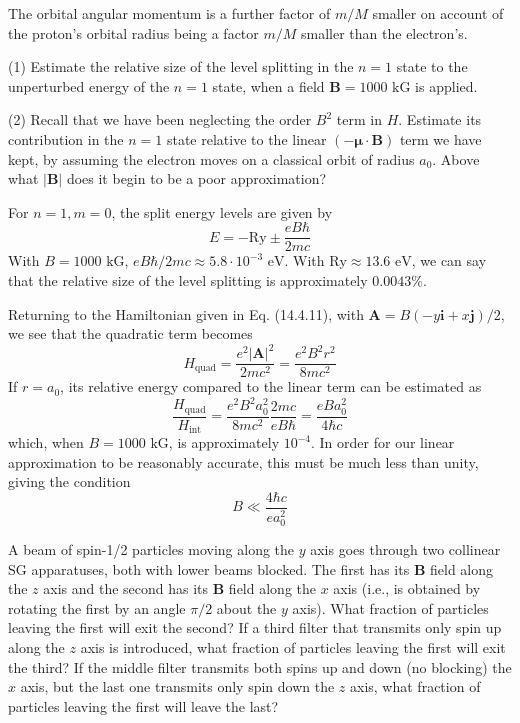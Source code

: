 \documentclass[../principles-of-quantum-mechanics.tex]{subfiles}
\begin{document}
\begin{questions}
\begin{solution}
		The orbital angular momentum is a further factor of $m/M$ smaller on account of the proton's orbital radius being a factor $m/M$ smaller than the electron's.
	\end{solution}
	
	\question (1) Estimate the relative size of the level splitting in the $n=1$ state to the unperturbed energy of the $n=1$ state, when a field $\mathbf{B}=1000\text{ kG}$ is applied.
	
	(2) Recall that we have been neglecting the order $B^2$ term in $H$. Estimate its contribution in the $n=1$ state relative to the linear $(-\boldsymbol{\mu}\cdot\mathbf{B})$ term we have kept, by assuming the electron moves on a classical orbit of radius $a_0$. Above what $|\mathbf{B}|$ does it begin to be a poor approximation?
	
	\begin{solution}
		For $n = 1, m = 0$, the split energy levels are given by
		$$E = -\mathrm{Ry} \pm \frac{eB\hbar}{2mc}$$
		With $B = 1000\text{ kG}$, $eB\hbar/2mc \approx 5.8\cdot10^{-3}\text{ eV}$. With $\mathrm{Ry} \approx 13.6\text{ eV}$, we can say that the relative size of the level splitting is approximately $0.0043\%$.
		
		Returning to the Hamiltonian given in Eq. (14.4.11), with $\mathbf{A} = B({-y}\mathbf{i} + x\mathbf{j})/2$, we see that the quadratic term becomes
		$$H_\text{quad} = \frac{e^2|\mathbf{A}|^2}{2mc^2} = \frac{e^2B^2r^2}{8mc^2}$$
		If $r = a_0$, its relative energy compared to the linear term can be estimated as
		$$\frac{H_\text{quad}}{H_\text{int}} = \frac{e^2B^2a_0^2}{8mc^2}\frac{2mc}{eB\hbar} = \frac{eBa_0^2}{4\hbar c}$$
		which, when $B = 1000\text{ kG}$, is approximately $10^{-4}$. In order for our linear approximation to be reasonably accurate, this must be much less than unity, giving the condition
		$$B \ll \frac{4\hbar c}{ea_0^2}$$
	\end{solution}
	
	\question A beam of spin-1/2 particles moving along the $y$ axis goes through two collinear SG apparatuses, both with lower beams blocked. The first has its $\mathbf{B}$ field along the $z$ axis and the second has its $\mathbf{B}$ field along the $x$ axis (i.e., is obtained by rotating the first by an angle $\pi/2$ about the $y$ axis). What fraction of particles leaving the first will exit the second? If a third filter that transmits only spin up along the $z$ axis is introduced, what fraction of particles leaving the first will exit the third? If the middle filter transmits both spins up and down (no blocking) the $x$ axis, but the last one transmits only spin down the $z$ axis, what fraction of particles leaving the first will leave the last?
	

\end{questions}
\end{document}
